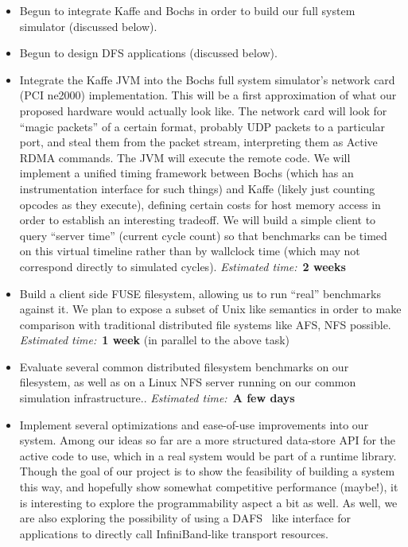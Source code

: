 \documentclass[10pt]{article}
\begin{document}
\begin{itemize}

\item Begun to integrate Kaffe and Bochs in order to build our full
  system simulator (discussed below).
  \item Begun to design DFS applications (discussed below).

\item Integrate the Kaffe JVM into the Bochs full system simulator's
  network card (PCI ne2000) implementation. This will be a first
  approximation of what our proposed hardware would actually look
  like. The network card will look for ``magic packets'' of a certain
  format, probably UDP packets to a particular port, and steal them
  from the packet stream, interpreting them as Active RDMA
  commands. The JVM will execute the remote code. We will implement a
  unified timing framework between Bochs (which has an instrumentation
  interface for such things) and Kaffe (likely just counting opcodes
  as they execute), defining certain costs for host memory access in
  order to establish an interesting tradeoff. We will build a simple
  client to query ``server time'' (current cycle count) so that
  benchmarks can be timed on this virtual timeline rather than by
  wallclock time (which may not correspond directly to simulated
  cycles). \emph{Estimated time:}~\textbf{2 weeks}

\item Build a client side FUSE filesystem, allowing us to run
  ``real'' benchmarks against it. We plan to expose a subset
  of Unix like semantics in order to make comparison with
  traditional distributed file systems like AFS, NFS possible.
  \emph{Estimated time:}~\textbf{1 week} (in parallel to the above task)

\item Evaluate several common distributed filesystem benchmarks on our
  filesystem, as well as on a Linux NFS server running on our common
  simulation infrastructure.. \emph{Estimated time:}~\textbf{A few
    days}

\item Implement several optimizations and ease-of-use improvements
  into our system. Among our ideas so far are a more structured
  data-store API for the active code to use, which in a real system
  would be part of a runtime library. Though the goal of our project
  is to show the feasibility of building a system this way, and
  hopefully show somewhat competitive performance (maybe!), it is
  interesting to explore the programmability aspect a bit as well. As
  well, we are also exploring the possibility of using a
  DAFS~\cite{DAFS} like interface for applications to directly call
  InfiniBand-like transport resources.

\end{itemize}
\end{document}
